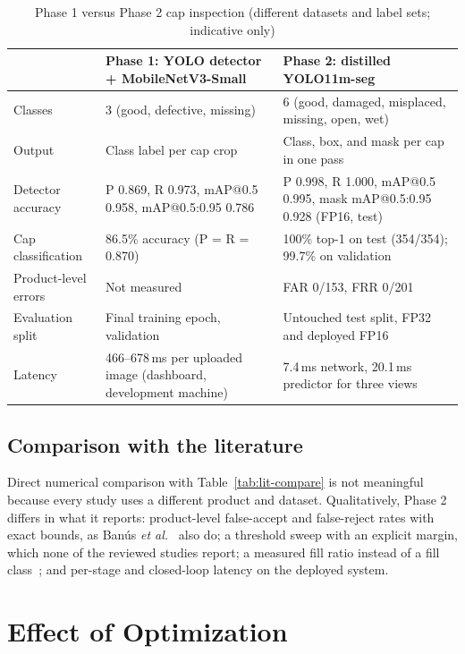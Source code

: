 \begin{table}[htbp]
\centering
\caption{Phase 1 versus Phase 2 cap inspection (different datasets and label sets; indicative only)}
\label{tab:phase-compare}
\begin{tabularx}{\textwidth}{|L{3.3cm}|X|X|}
\hline
 & \textbf{Phase 1: YOLO detector + MobileNetV3-Small} & \textbf{Phase 2: distilled YOLO11m-seg} \\ \hline
Classes & 3 (good, defective, missing) & 6 (good, damaged, misplaced, missing, open, wet) \\ \hline
Output & Class label per cap crop & Class, box, and mask per cap in one pass \\ \hline
Detector accuracy & P 0.869, R 0.973, mAP@0.5 0.958, mAP@0.5:0.95 0.786 & P 0.998, R 1.000, mAP@0.5 0.995, mask mAP@0.5:0.95 0.928 (FP16, test) \\ \hline
Cap classification & 86.5\% accuracy (P = R = 0.870) & 100\% top-1 on test (354/354); 99.7\% on validation \\ \hline
Product-level errors & Not measured & FAR 0/153, FRR 0/201 \\ \hline
Evaluation split & Final training epoch, validation & Untouched test split, FP32 and deployed FP16 \\ \hline
Latency & 466--678\,ms per uploaded image (dashboard, development machine) & 7.4\,ms network, 20.1\,ms predictor for three views \\ \hline
\end{tabularx}
\end{table}

\subsection{Comparison with the literature}
Direct numerical comparison with Table~\ref{tab:lit-compare} is not meaningful because every study uses a different product and dataset. Qualitatively, Phase 2 differs in what it reports: product-level false-accept and false-reject rates with exact bounds, as Ban\'us \textit{et al.}~\cite{banus2021} also do; a threshold sweep with an explicit margin, which none of the reviewed studies report; a measured fill ratio instead of a fill class~\cite{chatchapol2024}; and per-stage and closed-loop latency on the deployed system.

\section{Effect of Optimization}
\label{sec:model-optimization}

